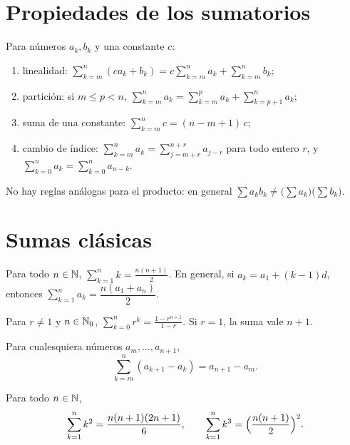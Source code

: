 \section{Propiedades de los sumatorios}

\begin{proposicion}\label{prop:sumas}
Para números $a_k,b_k$ y una constante $c$:
\begin{enumerate}
  \item linealidad: $\sum_{k=m}^n(ca_k+b_k)=c\sum_{k=m}^na_k+\sum_{k=m}^nb_k$;
  \item partición: si $m\le p<n$, $\sum_{k=m}^na_k=\sum_{k=m}^pa_k+\sum_{k=p+1}^na_k$;
  \item suma de una constante: $\sum_{k=m}^nc=(n-m+1)\,c$;
  \item cambio de índice: $\sum_{k=m}^na_k=\sum_{j=m+r}^{n+r}a_{j-r}$ para todo entero $r$, y $\sum_{k=0}^na_k=\sum_{k=0}^na_{n-k}$.
\end{enumerate}
\end{proposicion}

No hay reglas análogas para el producto: en general $\sum a_kb_k\neq\bigl(\sum a_k\bigr)\bigl(\sum b_k\bigr)$.

\section{Sumas clásicas}

\begin{teorema}\label{teo:aritmetica}
Para todo $n\in\mathbb{N}$, $\displaystyle\sum_{k=1}^nk=\frac{n(n+1)}2$. En general, si $a_k=a_1+(k-1)d$, entonces $\sum_{k=1}^na_k=\dfrac{n(a_1+a_n)}{2}$.
\end{teorema}

\begin{teorema}\label{teo:geometrica}
Para $r\neq1$ y $n\in\mathbb{N}_0$, $\displaystyle\sum_{k=0}^nr^k=\frac{1-r^{n+1}}{1-r}$. Si $r=1$, la suma vale $n+1$.
\end{teorema}

\begin{proposicion}\label{prop:telescopica}
Para cualesquiera números $a_m,\dots,a_{n+1}$,
\[
\sum_{k=m}^n(a_{k+1}-a_k)=a_{n+1}-a_m.
\]
\end{proposicion}

\addtocounter{definicion}{1}%

\begin{teorema}\label{teo:potencias}
Para todo $n\in\mathbb{N}$,
\[
\sum_{k=1}^nk^2=\frac{n(n+1)(2n+1)}6,\qquad\sum_{k=1}^nk^3=\Bigl(\frac{n(n+1)}2\Bigr)^2.
\]
\end{teorema}

